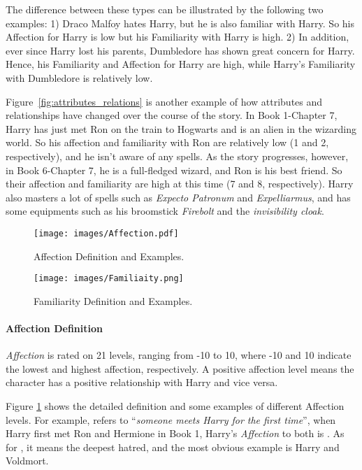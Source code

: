 \documentclass[11pt]{article}
\begin{document}
The difference between these types can be illustrated by the following two examples: 1) Draco Malfoy hates Harry, but he is also familiar with Harry. So his Affection for Harry is low but his Familiarity with Harry is high. 2) In addition, ever since Harry lost his parents, Dumbledore has shown great concern for Harry. Hence, his Familiarity and Affection for Harry are high, while Harry's Familiarity with Dumbledore is relatively low. 

Figure~\ref{fig:attributes_relations} is another example of how attributes and relationships have changed over the course of the story. In Book 1-Chapter 7, Harry has just met Ron on the train to Hogwarts and is an alien in the wizarding world. So his affection and familiarity with Ron are relatively low (1 and 2, respectively), and he isn't aware of any spells. As the story progresses, however, in Book 6-Chapter 7, he is a full-fledged wizard, and Ron is his best friend. So their affection and familiarity are high at this time (7 and 8, respectively). Harry also masters a lot of spells such as \textit{Expecto Patronum} and \textit{Expelliarmus}, and has some equipments such as his broomstick \textit{Firebolt} and the \textit{invisibility cloak}.



\begin{figure}
    \centering
    \texttt{[image: images/Affection.pdf]}
    \caption{Affection Definition and Examples.}
    \label{fig:affection_}
\end{figure}
\begin{figure}
    \centering
    \texttt{[image: images/Familiaity.png]}
       \caption{Familiarity Definition and Examples.}
\label{fig:familiarity_}
\end{figure}




\paragraph{Affection Definition}


\textit{Affection} is rated on 21 levels, ranging from -10 to 10, where -10 and 10 indicate the lowest and highest affection, respectively. 
A positive affection level means the character has a positive relationship with Harry and vice versa. 

Figure \ref{fig:affection_} shows the detailed definition and some examples 
of different Affection levels. For example,  refers to ``\textit{someone meets Harry for the first time}'', when Harry first met Ron and Hermione in Book 1, Harry's \textit{Affection} to both is . As for , it means the deepest hatred, and the most obvious example is Harry and Voldmort. 
\end{document}
